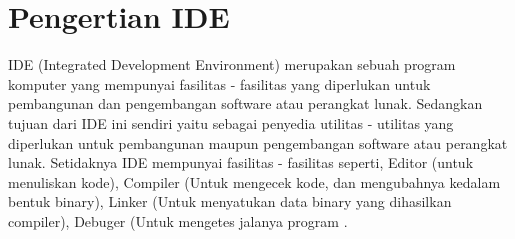 


\section {Pengertian IDE}
IDE (Integrated Development Environment) merupakan sebuah program komputer yang mempunyai fasilitas - fasilitas yang 
diperlukan untuk pembangunan dan pengembangan software atau perangkat lunak. Sedangkan tujuan dari IDE ini sendiri 
yaitu sebagai penyedia utilitas - utilitas yang diperlukan untuk pembangunan maupun pengembangan software atau perangkat lunak.
Setidaknya IDE mempunyai fasilitas - fasilitas seperti, Editor (untuk menuliskan kode), Compiler (Untuk mengecek kode, 
dan mengubahnya kedalam bentuk binary), Linker (Untuk menyatukan data binary yang dihasilkan compiler), Debuger (Untuk mengetes jalanya program \cite{aripurnamayana2012rancangan}.

